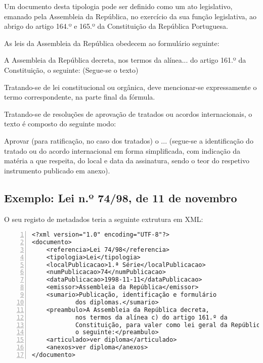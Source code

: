 Um documento desta tipologia pode ser definido como um ato legislativo, emanado pela Assembleia da República, 
no exercício da sua função legislativa, ao abrigo do artigo 164.º e 165.º da Constituição da República Portuguesa.

As leis da Assembleia da República obedecem ao formulário seguinte:
\begin{quoting}
A Assembleia da República decreta, nos termos da alínea... do artigo 161.º da Constituição, o seguinte:
(Segue-se o texto)
\end{quoting}

Tratando-se de lei constitucional ou orgânica, deve mencionar-se expressamente o termo correspondente, 
na parte final da fórmula. 

Tratando-se de resoluções de aprovação de tratados ou acordos internacionais, o texto é composto do seguinte modo:
\begin{quoting}
Aprovar (para ratificação, no caso dos tratados) o ... 
(segue-se a identificação do tratado ou do acordo internacional em forma simplificada, 
com indicação da matéria a que respeita, do local e data da assinatura, sendo o teor do respetivo 
instrumento publicado em anexo).
\end{quoting}

\subsection{Exemplo: Lei n.º 74/98, de 11 de novembro} 

O seu registo de metadados teria a seguinte extrutura em XML:

\begin{Verbatim}[frame=single, numbers=left, fontsize=\small, commandchars=\\\{\}]
<?xml version="1.0" encoding="UTF-8"?>
<documento>
    <referencia>Lei 74/98</referencia>
    <tipologia>Lei</tipologia>
    <localPublicacao>1.ª Série</localPublicacao>
    <numPublicacao>74</numPublicacao>
    <dataPublicacao>1998-11-11</dataPublicacao>
    <emissor>Assembleia da República</emissor>
    <sumario>Publicação, identificação e formulário 
            dos diplomas.</sumario>
    <preambulo>A Assembleia da República decreta, 
            nos termos da alínea c) do artigo 161.º da 
            Constituição, para valer como lei geral da República, 
            o seguinte:</preambulo>
    <articulado>ver diploma</articulado>
    <anexos>ver diploma</anexos>
</documento>
\end{Verbatim}

